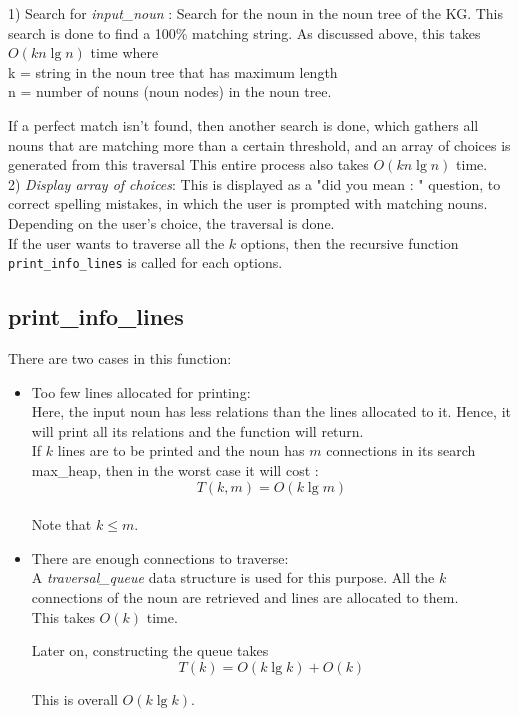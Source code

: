 \documentclass[conference]{IEEEtran}
\begin{document}
1) Search for \textit{input\_noun} : Search for the noun in the noun tree of the KG. This search is done to find a 100\% matching string. As discussed above, this takes  $O(kn \lg n)$  time where 
\\k = string in the noun tree that has maximum length
\\n = number of nouns (noun nodes) in the noun tree.

If a perfect match isn't found, then another search is done, which gathers all nouns that are matching more than a certain threshold, and an array of choices is generated from this traversal
This entire process also takes $O(kn \lg n)$ time.\\

2) \textit{Display array of choices}: This is displayed as a "did you mean : " question, to correct spelling mistakes, in which the user is prompted with matching nouns. Depending on the user’s choice, the traversal is done.\\

If the user wants to traverse all the $k$ options, then the recursive function \texttt{print\_info\_lines} is called for each options.

\subsection{\textbf{print\_info\_lines}}
There are two cases in this function:

\begin{itemize}
\item Too few lines allocated for printing: 
\\Here, the input noun has less relations than the lines allocated to it. Hence, it will print all its relations and the function will return. 
\\If $k$ lines are to be printed and the noun has $m$ connections in its search max\_heap, then in the worst case it will cost :
\begin{equation}
T(k, m) = O(k \lg m)
\end{equation}
\\Note that $k \leq m$.
\\

\item There are enough connections to traverse:
\\
A \textit{traversal\_queue} data structure is used for this purpose. All the $k$ connections of the noun are retrieved and lines are allocated to them. 
\\
This takes $O(k)$ time.

Later on, constructing the queue takes
\begin{equation}
	T(k) = O(k \lg k) + O(k)
\end{equation}

This is overall $O(k \lg k)$.
\end{itemize}
\end{document}
